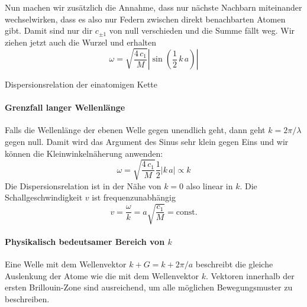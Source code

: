 Nun machen wir zusätzlich die Annahme, dass nur nächste Nachbarn miteinander wechselwirken, dass es also nur Federn zwischen direkt benachbarten Atomen gibt. Damit sind nur dir $c_{\pm 1}$ von null verschieden und die Summe fällt weg. Wir ziehen jetzt auch die Wurzel und erhalten
\begin{equation}
\omega = \sqrt{\frac{4 \, c_1}{M}} \left| \sin (\frac{1}{2} \, k \, a   ) \right| \label{eq:phonon_1atom}
\end{equation}

\begin{marginfigure}

\caption{Dispersionsrelation der einatomigen Kette}
\end{marginfigure}


\paragraph{Grenzfall langer Wellenlänge} Falls die Wellenlänge der ebenen Welle gegen unendlich geht, dann geht $k = 2 \pi / \lambda$  gegen null. Damit wird das Argument des Sinus sehr klein gegen Eins und wir können die Kleinwinkelnäherung anwenden:
\begin{equation}
\omega = \sqrt{\frac{4 \, c_1}{M}} \frac{1}{2}  |k \, a| \propto k
\end{equation}
Die Dispersionsrelation ist in der Nähe von $k = 0$ also linear in $k$. Die Schallgeschwindigkeit $v$ ist frequenzunabhängig
\begin{equation}
 v = \frac{\omega}{k} = a  \sqrt{\frac{ c_1}{M}}  = \text{const.}
\end{equation}



\paragraph{Physikalisch bedeutsamer Bereich von $k$} 

\begin{marginfigure}

\caption{Eine Welle mit dem Wellenvektor $k + G = k + 2\pi /a$ beschreibt die gleiche Auslenkung der Atome wie die mit dem Wellenvektor $k$.  Vektoren innerhalb der ersten Brillouin-Zone sind ausreichend, um alle möglichen Bewegungsmuster zu beschreiben. \label{fig:phonon_k_plus_g} }
\end{marginfigure}


